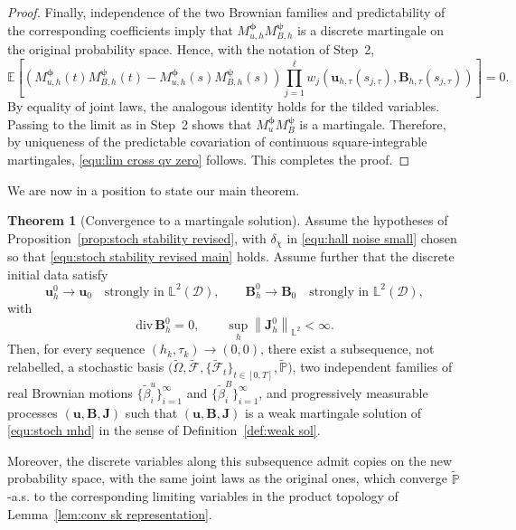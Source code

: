\documentclass[11pt, reqno]{amsart}
\theoremstyle{definition}
\newtheorem{theorem}{Theorem}[section]
\numberwithin{equation}{section}
\newcommand{\divg}{\mathrm{div}\,}
\newcommand{\bff}{\boldsymbol}
\newcommand{\bb}{\mathbb}
\newcommand{\norm}[2]{\left\|{#1}\right\|_{#2}}
\begin{document}
\begin{proof}
	Finally, independence of the two Brownian families and predictability of the corresponding coefficients imply that
	$M_{u,h}^{\bff\phi} M_{B,h}^{\bff\psi}$ is a discrete martingale on the
	original probability space. Hence, with the notation of Step~2,
	\[
	\bb E\left[
	\left(
	M_{u,h}^{\bff\phi}(t)M_{B,h}^{\bff\psi}(t)
	-
	M_{u,h}^{\bff\phi}(s)M_{B,h}^{\bff\psi}(s)
	\right)
	\prod_{j=1}^{\ell}
	w_j\left(
	\bff u_{h,\tau}(s_{j,\tau}),
	\bff B_{h,\tau}(s_{j,\tau})
	\right)
	\right]
	=0.
	\]
	By equality of joint laws, the analogous identity holds for the
	tilded variables. Passing to the limit as in Step~2 shows that
	$M_u^{\bff\phi}M_B^{\bff\psi}$ is a martingale. Therefore,
	by uniqueness of the predictable covariation of continuous
	square-integrable martingales, \eqref{equ:lim cross qv zero} follows.
	This completes the proof.
\end{proof}

We are now in a position to state our main theorem.


\begin{theorem}[Convergence to a martingale solution]
	\label{the:conv martingale solution}
	Assume the hypotheses of Proposition~\ref{prop:stoch stability revised},
	with $\delta_\chi$ in \eqref{equ:hall noise small} chosen so that
	\eqref{equ:stoch stability revised main} holds. Assume further that the
	discrete initial data satisfy
	\[
	\bff u_h^0\to\bff u_0
	\quad\text{strongly in }\bb L^2(\mathscr D),
	\qquad
	\bff B_h^0\to\bff B_0
	\quad\text{strongly in }\bb L^2(\mathscr D),
	\]
	with
	\[
	\divg\bff B_h^0=0,
	\qquad
	\sup_h\norm{\bff J_h^0}{\bb L^2}<\infty .
	\]
	Then, for every sequence $(h_k,\tau_k)\to(0,0)$, there exist a
	subsequence, not relabelled, a stochastic basis $\bigl(\widetilde\Omega,\widetilde{\mathscr F}, \{\widetilde{\mathscr F}_t\}_{t\in[0,T]}, \widetilde{\bb P}\bigr)$,
	two independent families of real Brownian motions
	$\{\widetilde\beta_i^u\}_{i=1}^{\infty}$ and
	$\{\widetilde\beta_i^B\}_{i=1}^{\infty}$, and progressively measurable
	processes $(\bff u,\bff B,\bff J)$ such that
	$(\bff u,\bff B,\bff J)$ is a weak martingale solution of
	\eqref{equ:stoch mhd} in the sense of Definition~\ref{def:weak sol}.
	
	Moreover, the discrete variables along this subsequence admit copies on
	the new probability space, with the same joint laws as the original
	ones, which converge $\widetilde{\bb P}$-a.s. to the corresponding
	limiting variables in the product topology of
	Lemma~\ref{lem:conv sk representation}.
\end{theorem}
\end{document}
